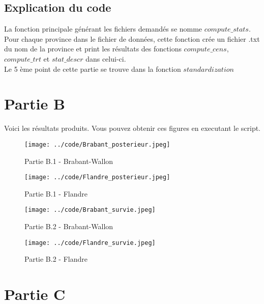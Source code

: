 \documentclass{article}
\begin{document}
\subsection{Explication du code}

La fonction principale générant les fichiers demandés se nomme $compute\_stats$. Pour chaque province dans le fichier de données, cette fonction crée un fichier .txt du nom de la province et print les résultats des fonctions $compute\_cens$, $compute\_trt$ et $stat\_descr$ dans celui-ci. \\
Le 5 ème point de cette partie se trouve dans la fonction $standardization$

\section{Partie B}
Voici les résultats produits. Vous pouvez obtenir ces figures en executant le script.

\begin{figure}[!h]
   \begin{minipage}[c]{.46\linewidth}
	\texttt{[image: ../code/Brabant\_posterieur.jpeg]}
	\caption{Partie B.1 - Brabant-Wallon}
   \end{minipage} \hfill
   \begin{minipage}[c]{.46\linewidth}
	\texttt{[image: ../code/Flandre\_posterieur.jpeg]}
	\caption{Partie B.1 - Flandre}
   \end{minipage}
\end{figure}

\begin{figure}[!h]
   \begin{minipage}[c]{.46\linewidth}
	\texttt{[image: ../code/Brabant\_survie.jpeg]}
	\caption{Partie B.2 - Brabant-Wallon}
   \end{minipage} \hfill
   \begin{minipage}[c]{.46\linewidth}
	\texttt{[image: ../code/Flandre\_survie.jpeg]}
	\caption{Partie B.2 - Flandre}
   \end{minipage}
\end{figure}

\section{Partie C}
\end{document}
